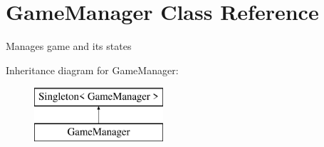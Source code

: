 \hypertarget{class_game_manager}{}\section{Game\+Manager Class Reference}
\label{class_game_manager}


Manages game and its states  


Inheritance diagram for Game\+Manager\+:\begin{figure}[H]
\begin{center}
\leavevmode
\includegraphics[height=2.000000cm]{class_game_manager}
\end{center}
\end{figure}
